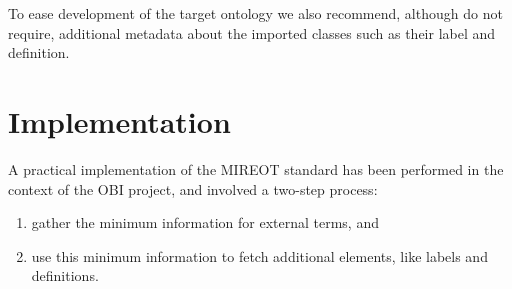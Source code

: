\documentclass[a4paper,10pt,twocolumn]{article}
\newcommand{\protege}{Prot\'{e}g\'{e}}
\begin{document}


To ease development of the target ontology we also recommend, although do not require, additional metadata about the imported classes such as their label and definition.





\section*{Implementation}

A practical implementation of the MIREOT standard has been performed in the context of the OBI project, and involved a two-step process:

\begin{enumerate}
\item gather the minimum information for external terms, and
\item use this minimum information to fetch additional elements, like labels and definitions.
\end{enumerate}

\end{document}
